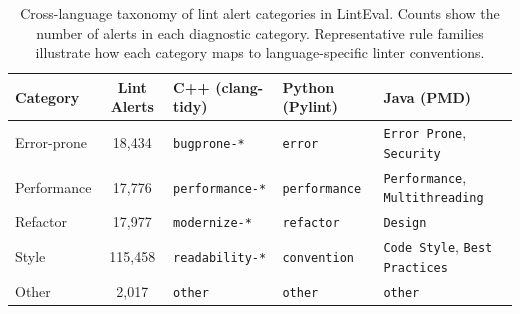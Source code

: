 \begin{table}[t]
\centering
\small
\begin{tabular}{lc lll}
\toprule
\textbf{Category} & \textbf{Lint Alerts} & \textbf{C++ (clang-tidy)} & \textbf{Python (Pylint)} & \textbf{Java (PMD)} \\
\midrule
Error-prone & 18,434  & \texttt{bugprone-*}    & \texttt{error}      & \texttt{Error Prone}, \texttt{Security} \\
Performance & 17,776  & \texttt{performance-*} & \texttt{performance}& \texttt{Performance}, \texttt{Multithreading} \\
Refactor    & 17,977  & \texttt{modernize-*}   & \texttt{refactor}   & \texttt{Design} \\
Style       & 115,458 & \texttt{readability-*} & \texttt{convention} & \texttt{Code Style}, \texttt{Best Practices} \\
Other       & 2,017   & \texttt{other}         & \texttt{other}      & \texttt{other} \\
\bottomrule
\end{tabular}
\caption{Cross-language taxonomy of lint alert categories in LintEval. Counts show the number of alerts in each diagnostic category. Representative rule families illustrate how each category maps to language-specific linter conventions.}
\label{tab:cross_language_mapping}
\end{table}